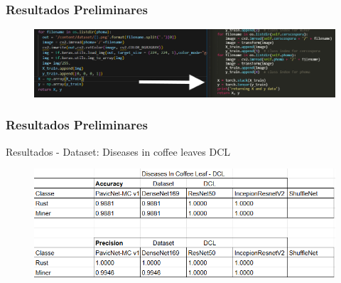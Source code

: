 \documentclass[aspectratio=169]{beamer}
\begin{document}

















\begin{frame}
    \frametitle{Resultados Preliminares}

    \centering

    \begin{figure}
        \centering
        \includegraphics[scale = 0.5]{img/imgprocess1.png}
        \label{fig:entelabel}
    \end{figure}




\end{frame}











\begin{frame}
    \frametitle{Resultados Preliminares}

    \centering
    Resultados - Dataset: Diseases in coffee leaves DCL
    \begin{figure}
        \centering
        \includegraphics[scale = 0.7]{img/dlcResults.png}
        \label{fig:entelabel}
    \end{figure}




\end{frame}
\end{document}
